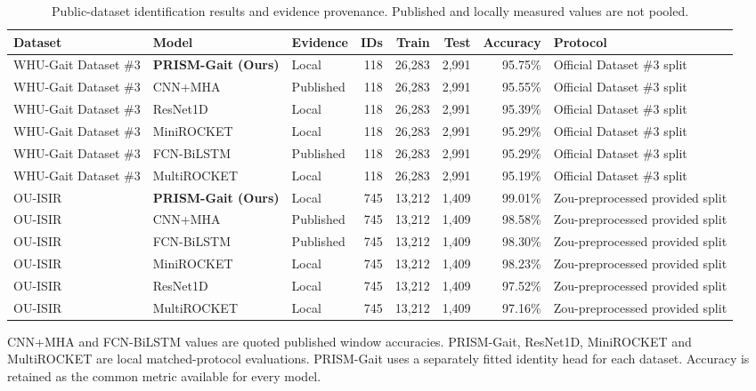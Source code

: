 \begin{table}[t]
\caption{Public-dataset identification results and evidence provenance. Published and locally measured values are not pooled.}
\label{tab:external_benchmark_provenance}
\centering
\small
\setlength{\tabcolsep}{3.5pt}
\renewcommand{\arraystretch}{1.16}
\begin{adjustbox}{max width=\textwidth}
\begin{tabular}{lllrrrrl}
\toprule
Dataset & Model & Evidence & IDs & Train & Test & Accuracy & Protocol \\
\midrule
WHU-Gait Dataset \#3 & \textbf{PRISM-Gait (Ours)} & Local & 118 & 26,283 & 2,991 & 95.75\% & Official Dataset \#3 split \\
WHU-Gait Dataset \#3 & CNN+MHA & Published & 118 & 26,283 & 2,991 & 95.55\% & Official Dataset \#3 split \\
WHU-Gait Dataset \#3 & ResNet1D & Local & 118 & 26,283 & 2,991 & 95.39\% & Official Dataset \#3 split \\
WHU-Gait Dataset \#3 & MiniROCKET & Local & 118 & 26,283 & 2,991 & 95.29\% & Official Dataset \#3 split \\
WHU-Gait Dataset \#3 & FCN-BiLSTM & Published & 118 & 26,283 & 2,991 & 95.29\% & Official Dataset \#3 split \\
WHU-Gait Dataset \#3 & MultiROCKET & Local & 118 & 26,283 & 2,991 & 95.19\% & Official Dataset \#3 split \\
\addlinespace[2pt]
OU-ISIR & \textbf{PRISM-Gait (Ours)} & Local & 745 & 13,212 & 1,409 & 99.01\% & Zou-preprocessed provided split \\
OU-ISIR & CNN+MHA & Published & 745 & 13,212 & 1,409 & 98.58\% & Zou-preprocessed provided split \\
OU-ISIR & FCN-BiLSTM & Published & 745 & 13,212 & 1,409 & 98.30\% & Zou-preprocessed provided split \\
OU-ISIR & MiniROCKET & Local & 745 & 13,212 & 1,409 & 98.23\% & Zou-preprocessed provided split \\
OU-ISIR & ResNet1D & Local & 745 & 13,212 & 1,409 & 97.52\% & Zou-preprocessed provided split \\
OU-ISIR & MultiROCKET & Local & 745 & 13,212 & 1,409 & 97.16\% & Zou-preprocessed provided split \\
\bottomrule
\end{tabular}
\end{adjustbox}
\vspace{2pt}
\parbox{0.98\textwidth}{\footnotesize CNN+MHA and FCN-BiLSTM values are quoted published window accuracies. PRISM-Gait, ResNet1D, MiniROCKET and MultiROCKET are local matched-protocol evaluations. PRISM-Gait uses a separately fitted identity head for each dataset. Accuracy is retained as the common metric available for every model.}
\end{table}
